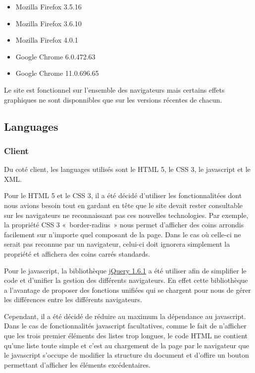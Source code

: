 \documentclass[letter, 11pt]{report}
\begin{document}
\begin{itemize}
	\item Mozilla Firefox 3.5.16
	\item Mozilla Firefox 3.6.10
	\item Mozilla Firefox 4.0.1
	\item Google Chrome 6.0.472.63
	\item Google Chrome 11.0.696.65
\end{itemize}

Le site est fonctionnel sur l'ensemble des navigateurs mais certains effets graphiques ne sont disponnibles que sur les versions récentes de chacun.

\subsection{Languages}
\subsubsection{Client}
Du coté client, les languages utilisés sont le HTML 5, le CSS 3, le javascript et le XML.

Pour le HTML 5 et le CSS 3, il a été décidé d'utiliser les fonctionnalitées dont nous avions besoin tout en gardant en tête que le site devait rester consultable sur les navigateurs ne reconnaissant pas ces nouvelles technologies. Par exemple, la propriété CSS 3 «~border-radius~» nous permet d'afficher des coins arrondis facilement sur n'importe quel composant de la page. Dans le cas où celle-ci ne serait pas reconnue par un navigateur, celui-ci doit ignorera simplement la propriété et affichera des coins carrés standards.

Pour le javascript, la bibliothèque \href{http://jquery.com/}{jQuery 1.6.1} a été utiliser afin de simplifier le code et d'unifier la gestion des différents navigateurs. En effet cette bibliothèque a l'avantage de proposer des fonctions unifiées qui se chargent pour nous de gérer les différences entre les différents navigateurs.

Cependant, il a été décidé de réduire au maximum la dépendance au javascript. Dans le cas de fonctionnalités javascript facultatives, comme le fait de n'afficher que les trois premier éléments des listes trop longues, le code HTML ne contient qu'une liste toute simple et c'est au chargement de la page par le navigateur que le javascript s'occupe de modifier la structure du document et d'offire un bouton permettant d'afficher les éléments excédentaires.
\end{document}
